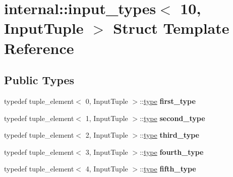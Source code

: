 \hypertarget{structinternal_1_1input__types_3_0110_00_01InputTuple_01_4}{}\section{internal\+:\+:input\+\_\+types$<$ 10, Input\+Tuple $>$ Struct Template Reference}
\label{structinternal_1_1input__types_3_0110_00_01InputTuple_01_4}
\subsection*{Public Types}
\begin{DoxyCompactItemize}
\item 
\hypertarget{structinternal_1_1input__types_3_0110_00_01InputTuple_01_4_a2e01fa379328ef72173c2f8fc55fdc1b}{}typedef tuple\+\_\+element$<$ 0, Input\+Tuple $>$\+::\hyperlink{classinternal_1_1tagged__msg}{type} {\bfseries first\+\_\+type}\label{structinternal_1_1input__types_3_0110_00_01InputTuple_01_4_a2e01fa379328ef72173c2f8fc55fdc1b}

\item 
\hypertarget{structinternal_1_1input__types_3_0110_00_01InputTuple_01_4_a7b4a3a7783a10c3d7b1c851f7cc58bc3}{}typedef tuple\+\_\+element$<$ 1, Input\+Tuple $>$\+::\hyperlink{classinternal_1_1tagged__msg}{type} {\bfseries second\+\_\+type}\label{structinternal_1_1input__types_3_0110_00_01InputTuple_01_4_a7b4a3a7783a10c3d7b1c851f7cc58bc3}

\item 
\hypertarget{structinternal_1_1input__types_3_0110_00_01InputTuple_01_4_ac98582cdd1d27c89b375085c5bb4b109}{}typedef tuple\+\_\+element$<$ 2, Input\+Tuple $>$\+::\hyperlink{classinternal_1_1tagged__msg}{type} {\bfseries third\+\_\+type}\label{structinternal_1_1input__types_3_0110_00_01InputTuple_01_4_ac98582cdd1d27c89b375085c5bb4b109}

\item 
\hypertarget{structinternal_1_1input__types_3_0110_00_01InputTuple_01_4_a1f1f6cfb646fa04bf24020d692a3e74b}{}typedef tuple\+\_\+element$<$ 3, Input\+Tuple $>$\+::\hyperlink{classinternal_1_1tagged__msg}{type} {\bfseries fourth\+\_\+type}\label{structinternal_1_1input__types_3_0110_00_01InputTuple_01_4_a1f1f6cfb646fa04bf24020d692a3e74b}

\item 
\hypertarget{structinternal_1_1input__types_3_0110_00_01InputTuple_01_4_a85da2256a1d67499c67942ea39ee3477}{}typedef tuple\+\_\+element$<$ 4, Input\+Tuple $>$\+::\hyperlink{classinternal_1_1tagged__msg}{type} {\bfseries fifth\+\_\+type}\label{structinternal_1_1input__types_3_0110_00_01InputTuple_01_4_a85da2256a1d67499c67942ea39ee3477}


\end{DoxyCompactItemize}
